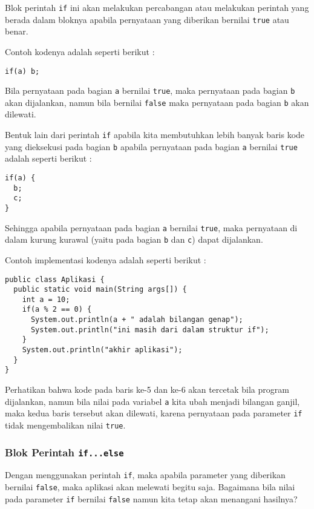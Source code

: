 Blok perintah \texttt{if} ini akan melakukan percabangan atau melakukan perintah yang berada dalam bloknya apabila pernyataan yang diberikan bernilai \texttt{true} atau benar.

Contoh kodenya adalah seperti berikut :

\begin{lstlisting}
if(a) b;
\end{lstlisting}

Bila pernyataan pada bagian \texttt{a} bernilai \texttt{true}, maka pernyataan pada bagian \texttt{b} akan dijalankan, namun bila bernilai \texttt{false} maka pernyataan pada bagian \texttt{b} akan dilewati.

Bentuk lain dari perintah \texttt{if} apabila kita membutuhkan lebih banyak baris kode yang dieksekusi pada bagian \texttt{b} apabila pernyataan pada bagian \texttt{a} bernilai \texttt{true} adalah seperti berikut :

\begin{lstlisting}
if(a) {
  b;
  c;
}
\end{lstlisting}

Sehingga apabila pernyataan pada bagian \texttt{a} bernilai \texttt{true}, maka pernyataan di dalam kurung kurawal (yaitu pada bagian \texttt{b} dan \texttt{c}) dapat dijalankan.

Contoh implementasi kodenya adalah seperti berikut :

\begin{lstlisting}
public class Aplikasi {
  public static void main(String args[]) {
    int a = 10;
    if(a % 2 == 0) {
      System.out.println(a + " adalah bilangan genap");
      System.out.println("ini masih dari dalam struktur if");
    }
    System.out.println("akhir aplikasi");
  }
}
\end{lstlisting}

Perhatikan bahwa kode pada baris ke-5 dan ke-6 akan tercetak bila program dijalankan, namun bila nilai pada variabel \texttt{a} kita ubah menjadi bilangan ganjil, maka kedua baris tersebut akan dilewati, karena pernyataan pada parameter \texttt{if} tidak mengembalikan nilai \texttt{true}.

\subsubsection{Blok Perintah \texttt{if...else}}

Dengan menggunakan perintah \texttt{if}, maka apabila parameter yang diberikan bernilai \texttt{false}, maka aplikasi akan melewati begitu saja. Bagaimana bila nilai pada parameter \texttt{if} bernilai \texttt{false} namun kita tetap akan menangani hasilnya? 

